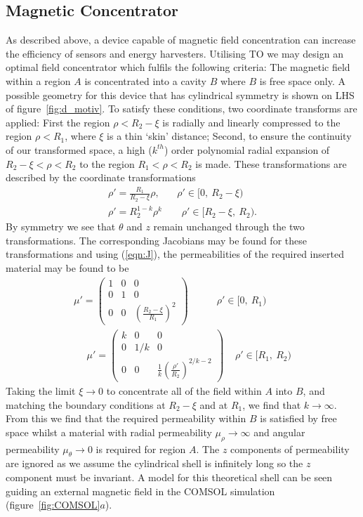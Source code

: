 \documentclass[11pt]{iopart}
\begin{document}
\subsection{Magnetic Concentrator}
As described above, a device capable of magnetic field concentration
can increase the efficiency of sensors and energy harvesters.
Utilising TO we may design an optimal field concentrator which fulfils
the following criteria: The magnetic field within a region $A$ is concentrated
into a cavity $B$ where $B$ is free space only. A possible geometry
for this device that has cylindrical symmetry is shown on LHS of
figure~\ref{fig:d_motiv}.  To satisfy these conditions, two coordinate
transforms are applied: First the region $\rho < R_2 - \xi$ is
radially and linearly compressed to the region $\rho < R_1$, where
$\xi$ is a thin `skin' distance; Second, to ensure the continuity of
our transformed space, a high ($k^{th}$) order polynomial radial
expansion of $R_2 - \xi < \rho < R_2$ to the region $R_1 < \rho < R_2$
is made. These transformations are described by the coordinate
transformations
\begin{equation}
  \label{eqn:transform}
  \begin{split}
\rho' = \frac{R_1}{R_2-\xi}\rho,~~~~~~~~\rho'\in[0,~R_2-\xi)~~\\
\rho' = R_2^{1-k}\rho^k~~~~~~~~~\rho'\in[R_2-\xi,~R_2).
  \end{split}
\end{equation}
By symmetry we see that $\theta$ and $z$ remain unchanged through the
two transformations. The corresponding Jacobians may be found for
these transformations and using (\ref{eqn:J}), the
permeabilities of the required inserted material may be found to be
\begin{equation}
  \label{eqn:mat}
  \begin{split}
 \mu' = \begin{pmatrix}1&0&0\\0&1&0\\0&0&(\frac{R_2-\xi}{R_1})^2\end{pmatrix}~~~~~~~~~~~~~\rho'\in[0,~R_1)~~\\
~~~~~~\mu' = \begin{pmatrix}k&0&0\\0&1/k&0\\0&0&\frac{1}{k}(\frac{\rho'}{R_2})^{2/k-2}\end{pmatrix}~~~~~\rho'\in[R_1,~R_2)
  \end{split}
\end{equation}
Taking the limit $\xi \rightarrow 0$ to concentrate all of
the field within $A$ into $B$, and matching the boundary conditions at
$R_2-\xi$ and at $R_1$, we find that $k \rightarrow \infty$. From this
we find that the required permeability within $B$ is satisfied by free
space whilst a material with radial permeability $\mu_\rho \rightarrow
\infty$ and angular permeability $\mu_\theta \rightarrow 0$ is
required for region $A$. The $z$ components of permeability are ignored
as we assume the cylindrical shell is
infinitely long so the $z$ component must be invariant. A model for
this theoretical shell can be seen guiding an external magnetic field
in the COMSOL simulation (figure~\ref{fig:COMSOL}$a$).
\end{document}
